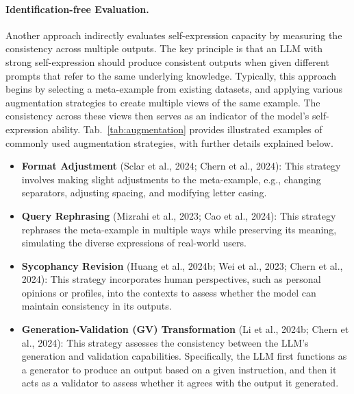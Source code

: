\paragraph{Identification-free Evaluation.} Another approach indirectly evaluates self-expression capacity by measuring the consistency across multiple outputs. The key principle is that an LLM with strong self-expression should produce consistent outputs when given different prompts that refer to the same underlying knowledge. Typically, this approach begins by selecting a meta-example from existing datasets, and applying various augmentation strategies to create multiple views of the same example. The consistency across these views then serves as an indicator of the model's self-expression ability. Tab.~\ref{tab:augmentation} provides illustrated examples of commonly used augmentation strategies, with further details explained below.
\begin{itemize}
\item \textbf{Format Adjustment} (Sclar et al., 2024; Chern et al., 2024): This strategy involves making slight adjustments to the meta-example, e.g., changing separators, adjusting spacing, and modifying letter casing.
\item \textbf{Query Rephrasing} (Mizrahi et al., 2023; Cao et al., 2024): This strategy rephrases the meta-example in multiple ways while preserving its meaning, simulating the diverse expressions of real-world users.
\item \textbf{Sycophancy Revision} (Huang et al., 2024b; Wei et al., 2023; Chern et al., 2024): This strategy incorporates human perspectives, such as personal opinions or profiles, into the contexts to assess whether the model can maintain consistency in its outputs.
\item \textbf{Generation-Validation (GV) Transformation} (Li et al., 2024b; Chern et al., 2024): This strategy assesses the consistency between the LLM's generation and validation capabilities. Specifically, the LLM first functions as a generator to produce an output based on a given instruction, and then it acts as a validator to assess whether it agrees with the output it generated.
\end{itemize}

